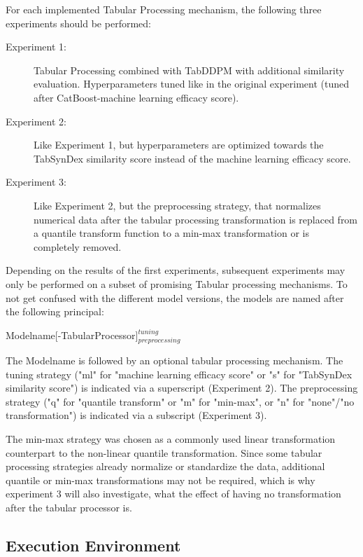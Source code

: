 \noindent For each implemented Tabular Processing mechanism, the following three experiments should be performed:

\begin{description}
	\item[Experiment 1:] Tabular Processing combined with TabDDPM with additional similarity evaluation. Hyperparameters tuned like in the original experiment (tuned after CatBoost-machine learning efficacy score).
	\item[Experiment 2:] Like Experiment 1, but hyperparameters are optimized towards the TabSynDex similarity score instead of the machine learning efficacy score.
	\item[Experiment 3:] Like Experiment 2, but the preprocessing strategy, that normalizes numerical data after the tabular processing transformation is replaced from a quantile transform function to a min-max transformation or is completely removed.
\end{description}

\noindent Depending on the results of the first experiments, subsequent experiments may only be performed on a subset of promising Tabular processing mechanisms.
To not get confused with the different model versions, the models are named after the following principal:

Modelname[-TabularProcessor]$^{tuning}_{preprocessing}$

The Modelname is followed by an optional tabular processing mechanism.
The tuning strategy ("ml" for "machine learning efficacy score" or "s" for "TabSynDex similarity score") is indicated via a superscript (Experiment 2).
The preprocessing strategy ("q" for "quantile transform" or "m" for "min-max", or "n" for "none"/"no transformation") is indicated via a subscript (Experiment 3).

The min-max strategy was chosen as a commonly used linear transformation counterpart to the non-linear quantile transformation.
Since some tabular processing strategies already normalize or standardize the data, additional quantile or min-max transformations may not be required, which is why experiment 3 will also investigate,
what the effect of having no transformation after the tabular processor is.

\subsection{Execution Environment}
\label{ch:environment}

